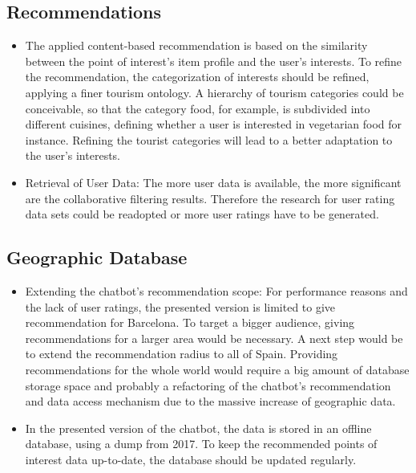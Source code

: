 \subsection{Recommendations}
\begin{itemize}
\item The applied content-based recommendation is based on the similarity between the point of interest’s item profile and the user’s interests. To refine the recommendation, the categorization of interests should be refined, applying a finer tourism ontology. A hierarchy of tourism categories could be conceivable, so that the category food, for example, is subdivided into different cuisines, defining whether a user is interested in vegetarian food for instance. Refining the tourist categories will lead to a better adaptation to the user’s interests.

\item Retrieval of User Data: The more user data is available, the more significant are the collaborative filtering results. Therefore the research for user rating data sets could be readopted or more user ratings have to be generated.
\end{itemize}

\subsection{Geographic Database}
\begin{itemize}
\item Extending the chatbot’s recommendation scope: For performance reasons and the lack of user ratings, the presented version is limited to give recommendation for Barcelona. To target a bigger audience, giving recommendations for a larger area would be necessary. A next step would be to extend the recommendation radius to all of Spain. Providing recommendations for the whole world would require a big amount of database storage space and probably a refactoring of the chatbot’s recommendation and data access mechanism due to the massive increase of geographic data. 

\item In the presented version of the chatbot, the data is stored in an offline database, using a dump from 2017. To keep the recommended points of interest data up-to-date, the database should be updated regularly. 
\end{itemize}
